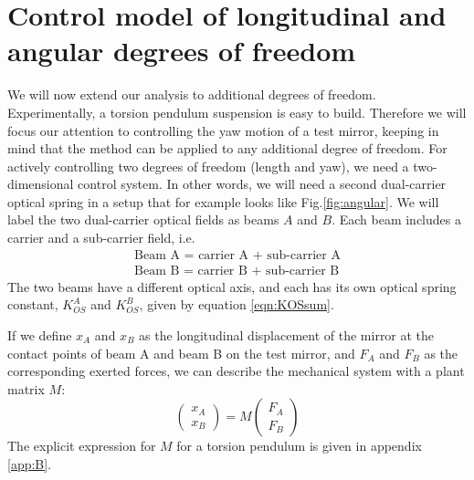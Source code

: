 
\section{Control model of longitudinal and angular degrees of freedom}
\label{sec:III} 

We will now extend our analysis to additional degrees of freedom. Experimentally, a torsion pendulum suspension is  easy to build. Therefore we will focus our attention to controlling the yaw motion of a test mirror, keeping in mind that the method can be applied to any additional degree of freedom. For actively controlling two degrees of freedom (length and yaw), we need a two-dimensional control system. In other words, we will need a second dual-carrier optical spring in a setup that for example looks like Fig.\ref{fig:angular}. We will label the two dual-carrier optical fields as beams $A$ and $B$. Each beam includes a carrier and a sub-carrier field, i.e.
\begin{eqnarray}
\label{eqn:beams}
\mbox{Beam A = carrier A + sub-carrier A}\\ \nonumber
\mbox{Beam B = carrier B + sub-carrier B}\nonumber
\end{eqnarray}
The two beams have a different optical axis, and each has its own optical spring constant, $K_{OS}^A$ and $K_{OS}^B$, given by equation 
\ref{eqn:KOSsum}.

If we define $x_A$ and $x_B$ as the longitudinal displacement of the mirror at the contact points
of beam A and beam B on the test mirror,
 and $F_A$ and $F_B$ as the corresponding exerted forces, we can describe the mechanical system with a plant matrix $M$:
\begin{equation}
 \begin{pmatrix}
x_A\\ x_B
\end{pmatrix} 
=
M \begin{pmatrix}
F_{A}\\ F_{B}
\end{pmatrix}
\label{eq:MF}
\end{equation}
The explicit expression for $M$ for a torsion pendulum is given in appendix \ref{app:B}.

